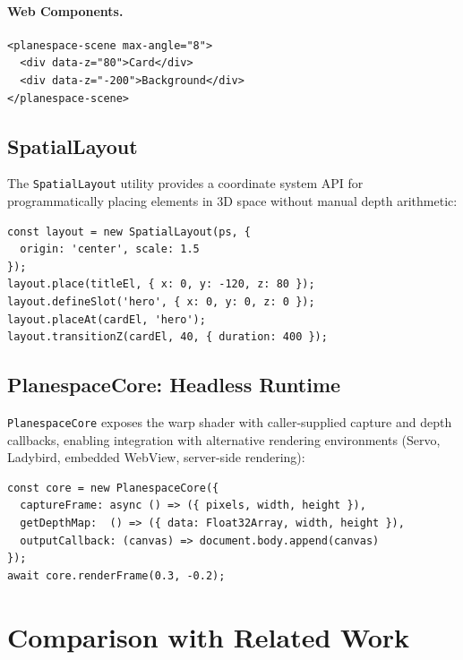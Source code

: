 \documentclass[10pt,twocolumn]{article}
\begin{document}
\paragraph{Web Components.}
\begin{lstlisting}[style=js,caption={Web Component usage.},numbers=none]
<planespace-scene max-angle="8">
  <div data-z="80">Card</div>
  <div data-z="-200">Background</div>
</planespace-scene>
\end{lstlisting}

\subsection{SpatialLayout}

The \texttt{SpatialLayout} utility provides a coordinate system API for
programmatically placing elements in 3D space without manual depth arithmetic:

\begin{lstlisting}[style=js,caption={SpatialLayout coordinate placement.},numbers=none]
const layout = new SpatialLayout(ps, {
  origin: 'center', scale: 1.5
});
layout.place(titleEl, { x: 0, y: -120, z: 80 });
layout.defineSlot('hero', { x: 0, y: 0, z: 0 });
layout.placeAt(cardEl, 'hero');
layout.transitionZ(cardEl, 40, { duration: 400 });
\end{lstlisting}

\subsection{PlanespaceCore: Headless Runtime}

\texttt{PlanespaceCore} exposes the warp shader with caller-supplied capture
and depth callbacks, enabling integration with alternative rendering
environments (Servo, Ladybird, embedded WebView, server-side rendering):

\begin{lstlisting}[style=js,caption={PlanespaceCore headless usage.},numbers=none]
const core = new PlanespaceCore({
  captureFrame: async () => ({ pixels, width, height }),
  getDepthMap:  () => ({ data: Float32Array, width, height }),
  outputCallback: (canvas) => document.body.append(canvas)
});
await core.renderFrame(0.3, -0.2);
\end{lstlisting}

\section{Comparison with Related Work}
\label{sec:related}
\end{document}
